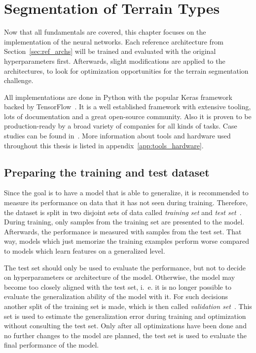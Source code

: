 \section{Segmentation of Terrain Types}
\label{sec:segmentation}
Now that all fundamentals are covered, this chapter focuses on the implementation of the neural networks. Each reference architecture from Section~\ref{sec:ref_archs} will be trained and evaluated with the original hyperparameters first. Afterwards, slight modifications are applied to the architectures, to look for optimization opportunities for the terrain segmentation challenge.

All implementations are done in Python with the popular Keras framework backed by TensorFlow~\cite{tf_whitepaper15}. It is a well established framework with extensive tooling, lots of documentation and a great open-source community. Also it is proven to be production-ready by a broad variety of companies for all kinds of tasks. Case studies can be found in~\cite{tf_casestudy20}. More information about tools and hardware used throughout this thesis is listed in appendix~\ref{app:tools_hardware}.

\subsection{Preparing the training and test dataset}
\label{sec:prepare_train_test}
Since the goal is to have a model that is able to generalize, it is recommended to measure its performance on data that it has not seen during training. Therefore, the dataset is split in two disjoint sets of data called \emph{training set} and \emph{test set}~\cite[p.~101f]{DLbook16}. During training, only samples from the training set are presented to the model. Afterwards, the performance is measured with samples from the test set. That way, models which just memorize the training examples perform worse compared to models which learn features on a generalized level.

The test set should only be used to evaluate the performance, but not to decide on hyperparameters or architecture of the model. Otherwise, the model may become too closely aligned with the test set, i.~e. it is no longer possible to evaluate the generalization ability of the model with it. For such decisions another split of the training set is made, which is then called \emph{validation set}~\cite[p.~119]{DLbook16}. This set is used to estimate the generalization error during training and optimization without consulting the test set. Only after all optimizations have been done and no further changes to the model are planned, the test set is used to evaluate the final performance of the model.

